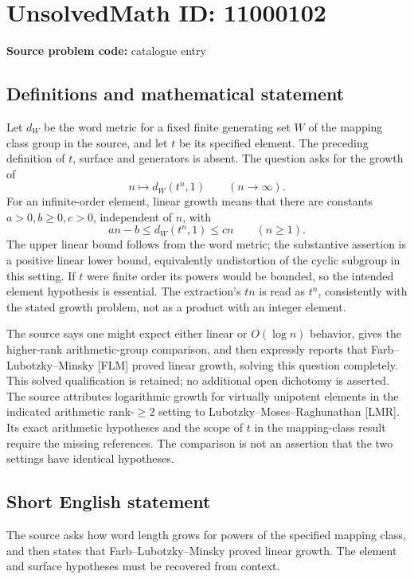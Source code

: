 \documentclass[11pt]{article}
\begin{document}
\section*{UnsolvedMath ID: 11000102}
\textbf{Source problem code:} catalogue entry
\subsection{Definitions and mathematical statement}
Let \(d_W\) be the word metric for a fixed finite generating set \(W\) of the mapping class group in the source, and let \(t\) be its specified element. The preceding definition of \(t\), surface and generators is absent. The question asks for the growth of
\[n\longmapsto d_W(t^n,1)\qquad(n\to\infty).\]
For an infinite-order element, linear growth means that there are constants \(a>0,b\geq0,c>0\), independent of \(n\), with
\[an-b\leq d_W(t^n,1)\leq cn\qquad(n\geq1).\]
The upper linear bound follows from the word metric; the substantive assertion is a positive linear lower bound, equivalently undistortion of the cyclic subgroup in this setting. If \(t\) were finite order its powers would be bounded, so the intended element hypothesis is essential. The extraction's \(tn\) is read as \(t^n\), consistently with the stated growth problem, not as a product with an integer element.

The source says one might expect either linear or \(O(\log n)\) behavior, gives the higher-rank arithmetic-group comparison, and then expressly reports that Farb--Lubotzky--Minsky [FLM] proved linear growth, solving this question completely. This solved qualification is retained; no additional open dichotomy is asserted. The source attributes logarithmic growth for virtually unipotent elements in the indicated arithmetic rank-\(\geq2\) setting to Lubotzky--Moses--Raghunathan [LMR]. Its exact arithmetic hypotheses and the scope of \(t\) in the mapping-class result require the missing references. The comparison is not an assertion that the two settings have identical hypotheses.
\subsection{Short English statement}
The source asks how word length grows for powers of the specified mapping class, and then states that Farb--Lubotzky--Minsky proved linear growth. The element and surface hypotheses must be recovered from context.
\end{document}
